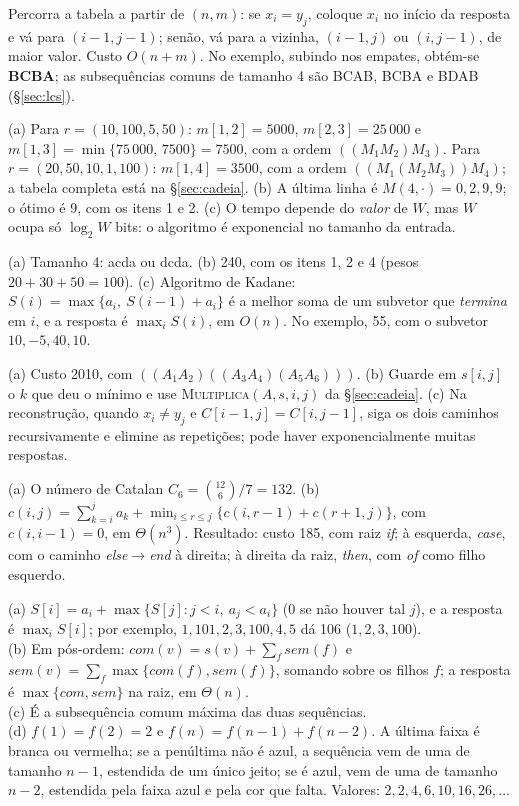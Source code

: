  Percorra a tabela a partir de $(n,m)$: se $x_i=y_j$, coloque $x_i$ no início da resposta e vá para $(i-1,j-1)$; senão, vá para a vizinha, $(i-1,j)$ ou $(i,j-1)$, de maior valor. Custo $O(n+m)$. No exemplo, subindo nos empates, obtém-se \textbf{BCBA}; as subsequências comuns de tamanho 4 são BCAB, BCBA e BDAB (§\ref{sec:lcs}).

 (a) Para $r=(10,100,5,50)$: $m[1,2]=5000$, $m[2,3]=25\,000$ e $m[1,3]=\min\{75\,000,\,7500\}=7500$, com a ordem $((M_1M_2)M_3)$. Para $r=(20,50,10,1,100)$: $m[1,4]=3500$, com a ordem $((M_1(M_2M_3))M_4)$; a tabela completa está na §\ref{sec:cadeia}. (b) A última linha é $M(4,\cdot)=0,2,9,9$; o ótimo é 9, com os itens 1 e 2. (c) O tempo depende do \emph{valor} de $W$, mas $W$ ocupa só $\log_2W$ bits: o algoritmo é exponencial no tamanho da entrada.

 (a) Tamanho 4: \textrm{acda} ou \textrm{dcda}. (b) 240, com os itens 1, 2 e 4 (pesos $20+30+50=100$). (c) Algoritmo de Kadane: $S(i)=\max\{a_i,\ S(i-1)+a_i\}$ é a melhor soma de um subvetor que \emph{termina} em $i$, e a resposta é $\max_iS(i)$, em $O(n)$. No exemplo, 55, com o subvetor $10,-5,40,10$.

 (a) Custo 2010, com $((A_1A_2)((A_3A_4)(A_5A_6)))$. (b) Guarde em $s[i,j]$ o $k$ que deu o mínimo e use \textsc{Multiplica}$(A,s,i,j)$ da §\ref{sec:cadeia}. (c) Na reconstrução, quando $x_i\ne y_j$ e $C[i-1,j]=C[i,j-1]$, siga os dois caminhos recursivamente e elimine as repetições; pode haver exponencialmente muitas respostas.

 (a) O número de Catalan $C_6=\binom{12}6/7=132$. (b) $c(i,j)=\sum_{k=i}^ja_k+\min_{i\le r\le j}\{c(i,r-1)+c(r+1,j)\}$, com $c(i,i-1)=0$, em $\Theta(n^3)$. Resultado: custo 185, com raiz \emph{if}; à esquerda, \emph{case}, com o caminho \emph{else}$\to$\emph{end} à direita; à direita da raiz, \emph{then}, com \emph{of} como filho esquerdo.

 (a) $S[i]=a_i+\max\{S[j]:j<i,\ a_j<a_i\}$ (0 se não houver tal $j$), e a resposta é $\max_iS[i]$; por exemplo, $1,101,2,3,100,4,5$ dá 106 ($1,2,3,100$).\\ (b) Em pós-ordem: $com(v)=s(v)+\sum_fsem(f)$ e $sem(v)=\sum_f\max\{com(f),sem(f)\}$, somando sobre os filhos $f$; a resposta é $\max\{com,sem\}$ na raiz, em $\Theta(n)$.\\ (c) É a subsequência comum máxima das duas sequências.\\ (d) $f(1)=f(2)=2$ e $f(n)=f(n-1)+f(n-2)$. A última faixa é branca ou vermelha; se a penúltima não é azul, a sequência vem de uma de tamanho $n-1$, estendida de um único jeito; se é azul, vem de uma de tamanho $n-2$, estendida pela faixa azul e pela cor que falta. Valores: $2,2,4,6,10,16,26,\dots$

